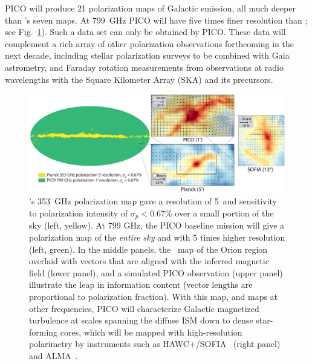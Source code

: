 \documentclass[PICOAPC.tex]{subfiles}
\begin{document}
PICO will produce 21 polarization maps of Galactic emission, all much deeper than \planck 's seven maps. At 799~GHz PICO will have five times finer resolution than \planck ; see Fig.~\ref{fig:allsky}). Such a data set can only be obtained by PICO. These data will complement a rich array of other polarization observations forthcoming in the next decade, including stellar polarization surveys to be combined with Gaia astrometry, and Faraday rotation measurements from  observations at radio wavelengths with the  Square Kilometer Array (SKA) and its precursors. 
\begin{figure}[ht]
    \centering
    \includegraphics[width=6.5in]{galsci_fig_v4.pdf}
\vspace{-0.25in}
    \caption{\captiontext  \planck 's 353~GHz polarization map gave a resolution of 5\arcmin~and sensitivity to polarization intensity of $\sigma_{p} < 0.67\%$ over a small portion of the sky (left, yellow).  At 799 GHz, the PICO baseline mission will give a polarization map of the {\it entire sky} and with 5 times higher resolution (left, green). In the middle panels, the \planck~map of the Orion region overlaid with vectors that are aligned with the inferred magnetic field (lower panel), and a simulated PICO observation (upper panel) illustrate the leap in information content (vector lengths are proportional to polarization fraction). With this map, and maps at other frequencies, PICO will characterize Galactic magnetized turbulence at scales spanning the diffuse ISM down to dense star-forming cores, which will be mapped with high-resolution polarimetry by instruments such as HAWC+/SOFIA~\citep{Chuss2018} (right panel) and ALMA~\citep{Bacciotti2018ApJ}.
    \label{fig:allsky} }
\vspace{-0.10in}
\end{figure}
\end{document}
